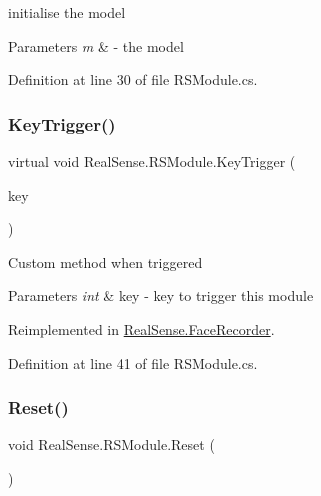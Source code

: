 initialise the model 
\begin{DoxyParams}{Parameters}
{\em m} & -\/ the model \\
\hline
\end{DoxyParams}


Definition at line 30 of file R\+S\+Module.\+cs.

\mbox{\label{class_real_sense_1_1_r_s_module_a8434d4aa8c289766b24e67cabb7e9471}} 
\subsubsection{\texorpdfstring{Key\+Trigger()}{KeyTrigger()}}
{\footnotesize\ttfamily virtual void Real\+Sense.\+R\+S\+Module.\+Key\+Trigger (\begin{DoxyParamCaption}\item[{int}]{key }\end{DoxyParamCaption})\hspace{0.3cm}{\ttfamily [virtual]}}

Custom method when triggered 
\begin{DoxyParams}{Parameters}
{\em int} & key -\/ key to trigger this module \\
\hline
\end{DoxyParams}


Reimplemented in \hyperlink{class_real_sense_1_1_face_recorder_a315985241eb6c21f6393d8104a967eb6}{Real\+Sense.\+Face\+Recorder}.



Definition at line 41 of file R\+S\+Module.\+cs.

\mbox{\label{class_real_sense_1_1_r_s_module_a5dc0fb567c84392f2469f5ed6445b10b}} 
\subsubsection{\texorpdfstring{Reset()}{Reset()}}
{\footnotesize\ttfamily void Real\+Sense.\+R\+S\+Module.\+Reset (\begin{DoxyParamCaption}{ }\end{DoxyParamCaption})}

